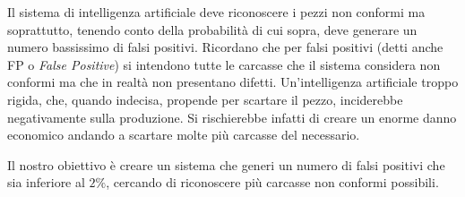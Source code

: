 Il sistema di intelligenza artificiale deve riconoscere i pezzi non conformi ma soprattutto, tenendo conto della probabilità di cui sopra, deve generare un numero bassissimo di falsi positivi.
Ricordano che per falsi positivi (detti anche FP o \textit{False Positive}) si intendono tutte le carcasse che il sistema considera non conformi ma che in realtà non presentano difetti.
Un'intelligenza artificiale troppo rigida, che, quando indecisa, propende per scartare il pezzo, inciderebbe negativamente sulla produzione.
Si rischierebbe infatti di creare un enorme danno economico andando a scartare molte più carcasse del necessario.

Il nostro obiettivo è creare un sistema che generi un numero di falsi positivi che sia inferiore al $2\%$, cercando di riconoscere più carcasse non conformi possibili.





